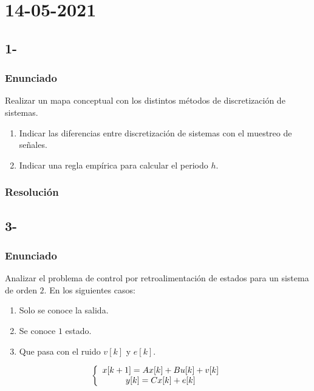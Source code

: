 \section*{14-05-2021}

\subsection*{1-}

\subsubsection*{Enunciado}

Realizar un mapa conceptual con los distintos métodos de  discretización de sistemas. 

\renewcommand{\labelenumi}{\alph{enumi})}
\begin{enumerate}
    \item Indicar las diferencias entre discretización de sistemas con el muestreo de señales. 
    \item Indicar una regla empírica para calcular el periodo $h$. 
\end{enumerate}

\subsubsection*{Resolución}

\subsection*{3-}

\subsubsection*{Enunciado}

Analizar el problema de control por retroalimentación de estados para 
un sistema de orden $2$. En los siguientes casos: 

\begin{enumerate}
    \item Solo se conoce la salida.
    \item Se conoce $1$ estado. 
    \item Que pasa con el ruido $v[k]$ y $e[k]$.
\end{enumerate}

\begin{equation}
    \left\{ \begin{array}{c} 
        x[k+1] = Ax[k] + Bu[k] + v[k] \\ 
        y[k] = Cx[k] + e[k]
     \end{array} \right.
\end{equation}


